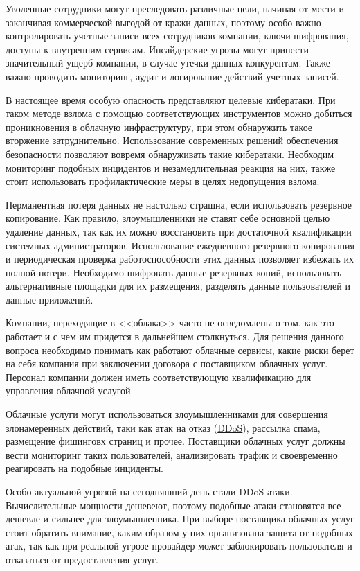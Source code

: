 Уволенные сотрудники могут преследовать различные цели, начиная от мести и заканчивая коммерческой выгодой от кражи данных, поэтому особо важно контролировать учетные записи всех сотрудников компании, ключи шифрования, доступы к внутренним сервисам.
Инсайдерские угрозы могут принести значительный ущерб компании, в случае утечки данных конкурентам.
Также важно проводить мониторинг, аудит и логирование действий учетных записей.

В настоящее время особую опасность представляют целевые кибератаки.
При таком методе взлома с помощью соответствующих инструментов можно добиться проникновения в облачную инфраструктуру, при этом обнаружить такое вторжение затруднительно.
Использование современных решений обеспечения безопасности позволяют вовремя обнаруживать такие кибератаки.
Необходим мониторинг подобных инцидентов и незамедлительная реакция на них, также стоит использовать профилактические меры в целях недопущения взлома.

Перманентная потеря данных не настолько страшна, если использовать резервное копирование.
Как правило, злоумышленники не ставят себе основной целью удаление данных, так как их можно восстановить при достаточной квалификации системных администраторов.
Использование ежедневного резервного копирования и периодическая проверка работоспособности этих данных позволяет избежать их полной потери.
Необходимо шифровать данные резервных копий, использовать альтернативные площадки для их размещения, разделять данные пользователей и данные приложений.

Компании, переходящие в <<облака>> часто не осведомлены о том, как это работает и с чем им придется в дальнейшем столкнуться.
Для решения данного вопроса необходимо понимать как работают облачные сервисы, какие риски берет на себя компания при заключении договора с поставщиком облачных услуг.
Персонал компании должен иметь соответствующую квалификацию для управления облачной услугой.

Облачные услуги могут использоваться злоумышленниками для совершения злонамеренных действий, таки как атак на отказ (\hyperlink{ddos}{DDoS}), рассылка спама, размещение фишинговх страниц и прочее.
Поставщики облачных услуг должны вести мониторинг таких пользователей, анализировать трафик и своевременно реагировать на подобные инциденты.

Особо актуальной угрозой на сегодняшний день стали DDoS-атаки.
Вычислительные мощности дешевеют, поэтому подобные атаки становятся все дешевле и сильнее для злоумышленника.
При выборе поставщика облачных услуг стоит обратить внимание, каким образом у них организована защита от подобных атак, так как при реальной угрозе провайдер может заблокировать пользователя и отказаться от предоставления услуг.

